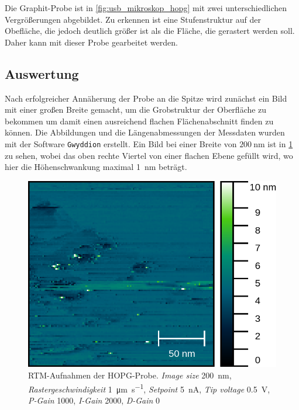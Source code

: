 Die Graphit-Probe ist in \cref{fig:usb_mikroskop_hopg} mit zwei unterschiedlichen
Vergrößerungen abgebildet. Zu erkennen ist eine Stufenstruktur auf der Obefläche, die jedoch
deutlich größer ist als die Fläche, die gerastert werden soll. Daher kann mit dieser
Probe gearbeitet werden.



\subsection*{Auswertung}

Nach erfolgreicher Annäherung der Probe an die Spitze wird zunächst ein Bild
mit einer großen Breite gemacht, um die Grobstruktur der Oberfläche
zu bekommen um damit einen ausreichend flachen Flächenabschnitt
finden zu können. Die Abbildungen und die Längenabmessungen der Messdaten wurden 
mit der Software \verb|Gwyddion| erstellt. Ein Bild bei einer Breite von $\SI{200}{\nm}$ ist in
\cref{fig:hopg_rtm_weitaufnahme} zu sehen, wobei das oben rechte Viertel
von einer flachen Ebene gefüllt wird, wo hier die Höhenschwankung maximal \SI{1}{\nm} beträgt.

\begin{figure}[htb]
	\centering
	\includegraphics[width=0.6\linewidth]{figs/HOPG10558.png}
	\caption{RTM-Aufnahmen der HOPG-Probe. \textit{Image size} \SI{200}{\nano \meter},
		\textit{Rastergeschwindigkeit} \SI{1}{\micro\m\per \second}, \textit{Setpoint} \SI{5}{\nano \ampere},
		\textit{Tip voltage} \SI{0.5}{\volt}, \textit{P-Gain} \num{1000}, \textit{I-Gain} \num{2000},
		\textit{D-Gain} \num{0}}
	\label{fig:hopg_rtm_weitaufnahme}
\end{figure}

